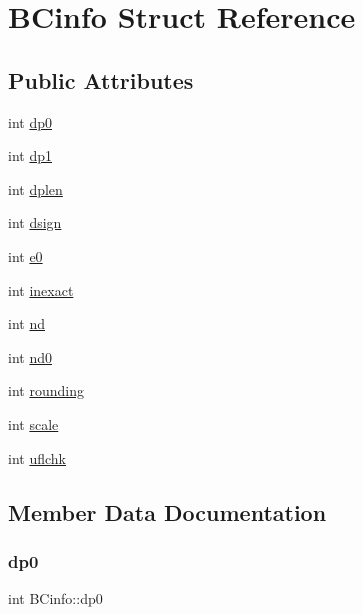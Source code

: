 \hypertarget{struct_b_cinfo}{}\section{B\+Cinfo Struct Reference}
\label{struct_b_cinfo}
\subsection*{Public Attributes}
\begin{DoxyCompactItemize}
\item 
int \hyperlink{struct_b_cinfo_a3964ec38e0c314af352712868f2dd704}{dp0}
\item 
int \hyperlink{struct_b_cinfo_abecc5c5f902ebd32160dfdf76d7d6547}{dp1}
\item 
int \hyperlink{struct_b_cinfo_a7dab2f1429125553774f6042e8411b1c}{dplen}
\item 
int \hyperlink{struct_b_cinfo_af31a6e71daa4846ff10effee255210eb}{dsign}
\item 
int \hyperlink{struct_b_cinfo_a3465f7cb1203532a3dc29c5a01e05526}{e0}
\item 
int \hyperlink{struct_b_cinfo_acac9270192035aab53d5832fb681040a}{inexact}
\item 
int \hyperlink{struct_b_cinfo_ac189da9f6f82f8846017c40e5872e4a7}{nd}
\item 
int \hyperlink{struct_b_cinfo_a9d30accd41a03e88ebd52591258b76fa}{nd0}
\item 
int \hyperlink{struct_b_cinfo_af42ca3177f8bd75dfe6435461332e748}{rounding}
\item 
int \hyperlink{struct_b_cinfo_a59b720f0388e80e21b950723aa53b56e}{scale}
\item 
int \hyperlink{struct_b_cinfo_a637b7e41de9291f100fdcc60267c222b}{uflchk}
\end{DoxyCompactItemize}


\subsection{Member Data Documentation}
\mbox{\label{struct_b_cinfo_a3964ec38e0c314af352712868f2dd704}} 
\subsubsection{\texorpdfstring{dp0}{dp0}}
{\footnotesize\ttfamily int B\+Cinfo\+::dp0}

